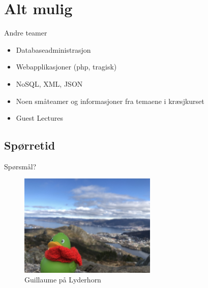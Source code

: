 \section{Alt mulig}
\begin{frame}{Andre teamer}
\begin{itemize}[<+->]
    \item Databaseadministrasjon
    \item Webapplikasjoner (php, tragisk)
    \item NoSQL, XML, JSON
    \item Noen småteamer og informasjoner fra temaene i kræsjkurset
    \item Guest Lectures
\end{itemize}
\end{frame}

\subsection*{Spørretid}
\begin{frame}{Spørsmål?}
    \begin{figure}
        \centering
        \includegraphics[height = 4.9cm]{images/guillaume8.jpg}
        \caption{Guillaume på Lyderhorn}
        \label{fig:guillaume8}
    \end{figure}
\end{frame}